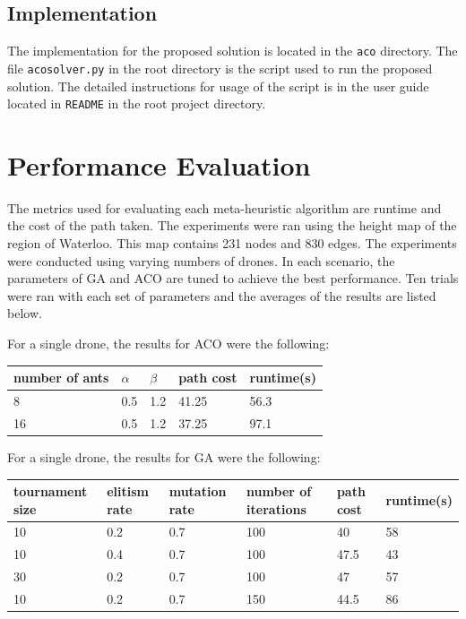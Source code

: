 \documentclass[conference]{IEEEtran}
\begin{document}
\subsection{Implementation}
The implementation for the proposed solution is located in the \verb|aco| directory. The file \verb|acosolver.py| in the root directory is the script used to run the proposed solution. The detailed instructions for usage of the script is in the user guide located in \verb|README| in the root project directory. 

\section{Performance Evaluation}
The metrics used for evaluating each meta-heuristic algorithm are runtime and the cost of the path taken. The experiments were ran using the height map of the region of Waterloo. This map contains 231 nodes and 830 edges. The experiments were conducted using varying numbers of drones. In each scenario, the parameters of GA and ACO are tuned to achieve the best performance. Ten trials were ran with each set of parameters and the averages of the results are listed below.

For a single drone, the results for ACO were the following:
\begin{center}
\begin{tabular}{ | m{1cm} | m{1cm}| m{1cm} | m{1.5cm} | m{1.5cm} |} 
\hline
number of ants & $\alpha$ & $\beta$ & path cost & runtime(s) \\ 
\hline
8 & 0.5 & 1.2 & 41.25 & 56.3 \\
\hline
16 & 0.5 & 1.2 & 37.25 & 97.1 \\ 
\hline
\end{tabular}
\end{center}

For a single drone, the results for GA were the following:
\begin{center}
\begin{tabular}{ | m{1.5cm} | m{1cm}| m{1cm} | m{1.5cm} | m{1.5cm} | m{1.5cm} |} 
\hline
tournament size & elitism rate & mutation rate & number of iterations & path cost & runtime(s) \\ 
\hline
10 & 0.2 & 0.7 & 100 & 40 & 58 \\ 
\hline
10 & 0.4 & 0.7 & 100 & 47.5 &  43  \\ 
\hline
30 & 0.2 & 0.7 & 100 & 47 &  57  \\ 
\hline
10 & 0.2 & 0.7 & 150 & 44.5 &  86  \\ 
\hline
\end{tabular}
\end{center}
\end{document}
